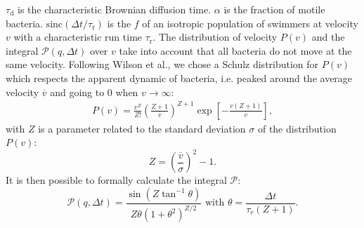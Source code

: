 \documentclass[%
 aip,
 jmp,%
 amsmath,amssymb,
reprint,%
]{revtex4-1}
\begin{document}
$\tau_\text{d}$ is the characteristic Brownian diffusion time. $\alpha$ is the fraction of motile bacteria. $\text{sinc}(\Delta t/\tau_\text{r})$ is the $f$ of an isotropic population of swimmers at velocity $v$ with a characteristic run time $\tau_\text{r}$. The distribution of velocity $P(v)$ and the integral $\mathcal{P}(q, \Delta t)$ over $v$ take into account that all bacteria do not move at the same velocity. Following Wilson et al.\cite{1_BactMobil}, we chose a Schulz distribution for $P(v)$ which respects the apparent dynamic of bacteria, i.e. peaked around the average velocity $\overline{v}$ and going to 0 when $v \rightarrow \infty$:
\begin{multline}
P(v) = \frac{v^Z}{Z!} \left(\frac{Z+1}{\overline{v}}\right)^{Z+1} \exp\left[-\frac{v(Z+1)}{\overline{v}}\right],
\end{multline}
with $Z$ is a parameter related to the standard deviation $\sigma$ of the distribution $P(v)$:
\begin{equation}
Z = \left( \frac{\overline{v}}{\sigma} \right)^2 -1.
\label{eq:sig}
\end{equation}
It is then possible to formally calculate the integral $\mathcal{P}$:
\begin{equation}
\mathcal{P}(q, \Delta t) = \frac{\sin\left(Z\tan^{-1}\theta\right)}{Z\theta\left(1+\theta^2\right)^{Z/2}}\text{ with }\theta = \frac{\Delta t}{\tau_r(Z+1)}. 
\end{equation}
\end{document}

